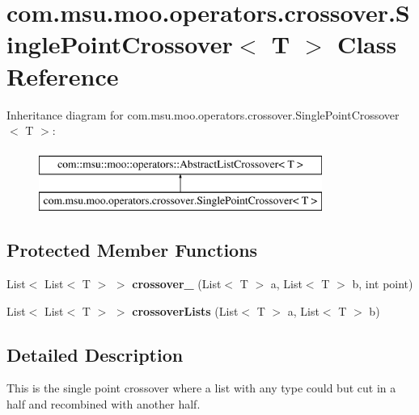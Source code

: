 \hypertarget{classcom_1_1msu_1_1moo_1_1operators_1_1crossover_1_1SinglePointCrossover_3_01T_01_4}{\section{com.\-msu.\-moo.\-operators.\-crossover.\-Single\-Point\-Crossover$<$ T $>$ Class Reference}
\label{classcom_1_1msu_1_1moo_1_1operators_1_1crossover_1_1SinglePointCrossover_3_01T_01_4}
}
Inheritance diagram for com.\-msu.\-moo.\-operators.\-crossover.\-Single\-Point\-Crossover$<$ T $>$\-:\begin{figure}[H]
\begin{center}
\leavevmode
\includegraphics[height=2.000000cm]{classcom_1_1msu_1_1moo_1_1operators_1_1crossover_1_1SinglePointCrossover_3_01T_01_4}
\end{center}
\end{figure}
\subsection*{Protected Member Functions}
\begin{DoxyCompactItemize}
\item 
\hypertarget{classcom_1_1msu_1_1moo_1_1operators_1_1crossover_1_1SinglePointCrossover_3_01T_01_4_ad3b2c7c7e131d6f25060fb6b35d9464a}{List$<$ List$<$ T $>$ $>$ {\bfseries crossover\-\_\-} (List$<$ T $>$ a, List$<$ T $>$ b, int point)}\label{classcom_1_1msu_1_1moo_1_1operators_1_1crossover_1_1SinglePointCrossover_3_01T_01_4_ad3b2c7c7e131d6f25060fb6b35d9464a}

\item 
\hypertarget{classcom_1_1msu_1_1moo_1_1operators_1_1crossover_1_1SinglePointCrossover_3_01T_01_4_abcf803e3fa69e6bdb37c16a4f1c4acba}{List$<$ List$<$ T $>$ $>$ {\bfseries crossover\-Lists} (List$<$ T $>$ a, List$<$ T $>$ b)}\label{classcom_1_1msu_1_1moo_1_1operators_1_1crossover_1_1SinglePointCrossover_3_01T_01_4_abcf803e3fa69e6bdb37c16a4f1c4acba}

\end{DoxyCompactItemize}


\subsection{Detailed Description}
This is the single point crossover where a list with any type could but cut in a half and recombined with another half.

